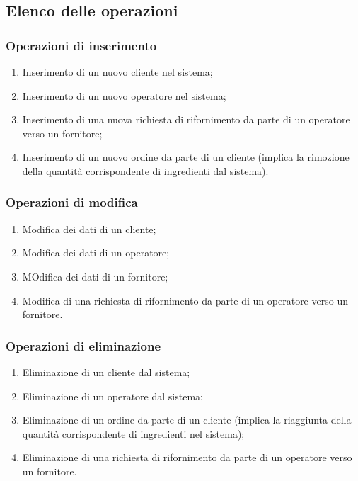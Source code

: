 \documentclass[12pt,a4paper]{article}
\begin{document}
    \subsection{Elenco delle operazioni}
    \subsubsection{Operazioni di inserimento}
    \begin{enumerate}[leftmargin=2.8em,label=\textbf{Op.\arabic*}]
        \item Inserimento di un nuovo cliente nel sistema;
        \item Inserimento di un nuovo operatore nel sistema;
        \item Inserimento di una nuova richiesta di rifornimento da parte di un operatore verso un fornitore;
        \item Inserimento di un nuovo ordine da parte di un cliente (implica la rimozione della quantità corrispondente di ingredienti dal sistema).
    \end{enumerate}

    \subsubsection{Operazioni di modifica}
    \begin{enumerate}[leftmargin=2.8em,label=\textbf{Op.\arabic*}]
        \item Modifica dei dati di un cliente;
        \item Modifica dei dati di un operatore;
        \item MOdifica dei dati di un fornitore;
        \item Modifica di una richiesta di rifornimento da parte di un operatore verso un fornitore.
    \end{enumerate}

    \subsubsection{Operazioni di eliminazione}
    \begin{enumerate}[leftmargin=2.8em,label=\textbf{Op.\arabic*}]
        \item Eliminazione di un cliente dal sistema;
        \item Eliminazione di un operatore dal sistema;
        \item Eliminazione di un ordine da parte di un cliente (implica la riaggiunta della quantità corrispondente di ingredienti nel sistema);
        \item Eliminazione di una richiesta di rifornimento da parte di un operatore verso un fornitore.
    \end{enumerate}
\end{document}
